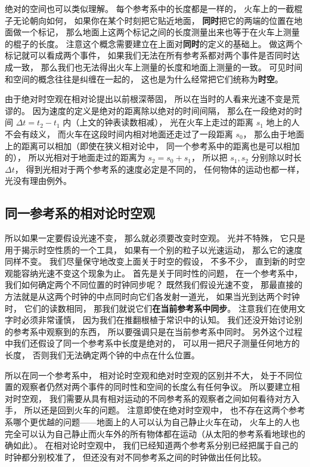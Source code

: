 绝对的空间也可以类似理解。 每个参考系中的长度都是一样的， 火车上的一截棍子无论朝向如何， 如果你在某个时刻把它贴近地面， \textbf{同时}把它的两端的位置在地面做一个标记， 那么地面上这两个标记之间的长度测量出来也等于在火车上测量的棍子的长度。 注意这个概念需要建立在上面对\textbf{同时}的定义的基础上。 做这两个标记就可以看成两个事件， 如果我们无法在所有参考系都对两个事件是否同时达成一致， 那么我们也无法得出火车上测量的长度和地面上测量的一致。 可见时间和空间的概念往往是纠缠在一起的， 这也是为什么经常把它们统称为\textbf{时空}。

由于绝对时空观在相对论提出以前根深蒂固， 所以在当时的人看来光速不变是荒谬的。 因为速度的定义是绝对的距离除以绝对的时间间隔， 那么在一段绝对的时间 $\Delta t = t_2 - t_1$ 内（上文的钟表读数相减）， 光在火车上走过的距离 $s_1$ 地上的人不会有歧义， 而火车在这段时间内相对地面还走过了一段距离 $s_0$， 那么由于地面上的距离可以相加（即使在狭义相对论中， 同一个参考系中的距离也是可以相加的）， 所以光相对于地面走过的距离为 $s_2 = s_0 + s_1$， 所以把 $s_1, s_2$ 分别除以时长 $\Delta t$， 得到光相对于两个参考系的速度必定是不同的， 任何物体的运动也都一样， 光没有理由例外。

\subsection{同一参考系的相对论时空观}
所以如果一定要假设光速不变， 那么就必须要改变时空观。 光并不特殊， 它只是用于揭示时空性质的一个工具， 如果有一个别的粒子以光速运动， 那么它的速度同样不变。 我们尽量保守地改变上面关于时空的假设， 不多不少， 直到新的时空观能容纳光速不变这个现象为止。 首先是关于同时性的问题， 在一个参考系中， 我们如何确定两个不同位置的时钟同步呢？ 既然我们假设光速不变， 那最直接的方法就是从这两个时钟的中点同时向它们各发射一道光， 如果当光到达两个时钟时， 它们的读数相同， 那我们就说它们\textbf{在当前参考系中同步}。 注意我们在使用文字时必须非常谨慎， 因为我们在推翻根植于常识中的认知。 我们还没开始讨论别的参考系中观察到的东西， 所以要强调只是在当前参考系中同时。 另外这个过程中我们还假设了同一个参考系中长度是绝对的， 可以用一把尺子测量任何地方的长度， 否则我们无法确定两个钟的中点在什么位置。

所以在同一个参考系中， 相对论时空观和绝对时空观的区别并不大， 处于不同位置的观察者仍然对两个事件的同时性和空间的长度么有任何争议。 所以要建立相对时空观， 我们需要从具有相对运动的不同参考系的观察者之间如何看待对方入手， 所以还是回到火车的问题。 注意即使在绝对时空观中， 也不存在这两个参考系哪个更优越的问题——地面上的人可以认为自己静止火车在动， 火车上的人也完全可以认为自己静止而火车外的所有物体都在运动（从太阳的参考系看地球也的确如此）。 在相对论时空观中， 我们已经知道两个参考系分别已经把属于自己的时钟都分别校准了， 但还没有对不同参考系之间的时钟做出任何比较。

